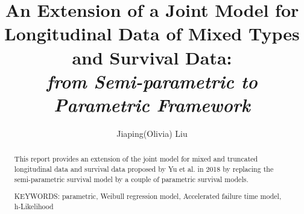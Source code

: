 \documentclass[10pt]{article}
\title{An Extension of a Joint Model for Longitudinal Data of Mixed Types and Survival Data:\\
\textit{from Semi-parametric to Parametric Framework}
}
\author{Jiaping(Olivia) Liu}
\begin{document}
\maketitle


\begin{abstract}
    This report provides an extension of the joint model for mixed and truncated longitudinal data and survival data proposed by Yu et al. in 2018 \cite{yu2018joint} by replacing the semi-parametric survival model by a couple of parametric survival models. 
    
    \noindent KEYWORDS: parametric, Weibull regression model, Accelerated failure time model, h-Likelihood
\end{abstract}








\printbibliography

\appendix
\renewcommand{\theequation}{A\thechapter.\arabic{equation}}

\end{document}
